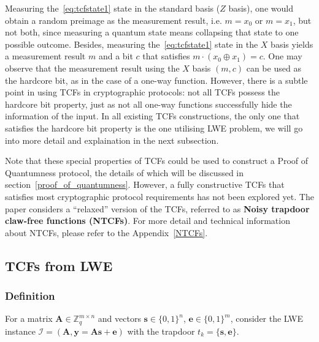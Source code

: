 \documentclass[cryptography,review,submit,pdftex,moreauthors,amsmath,amssymb,aps,strict]{Definitions/mdpi}
\begin{document}
Measuring the~\eqref{eq:tcfstate1} state in the standard basis ($Z$ basis), one would obtain a random preimage as the measurement result, i.e. $m=x_0$ or $m = x_1$, but not both, since measuring a quantum state means collapsing that state to one possible outcome. Besides, measuring the~\eqref{eq:tcfstate1} state in the $X$ basis yields a measurement result $m$ and a bit $c$ that satisfies $m \cdot (x_0\oplus x_1) = c$. One may observe that the measurement result using the $X$ basis $(m,c)$ can be used as the hardcore bit, as in the case of a one-way function. However, there is a subtle point in using TCFs in cryptographic protocols: not all TCFs possess the hardcore bit property, just as not all one-way functions successfully hide the information of the input. In all existing TCFs constructions, the only one that satisfies the hardcore bit property is the one utilising LWE problem, we will go into more detail and explaination in the next subsection.

Note that these special properties of TCFs could be used to construct a Proof of Quantumness protocol, the details of which will be discussed in section~\ref{proof_of_quantumness}. However, a fully constructive TCFs that satisfies most cryptographic protocol requirements has not been explored yet. The paper \cite{Brakerski18_Interactiveproofofquantumness} considers a ``relaxed'' version of the TCFs, referred to as \textbf{Noisy trapdoor claw-free functions (NTCFs)}. For more detail and technical information about NTCFs, please refer to the Appendix~\ref{NTCFs}.

\subsection{TCFs from LWE}
\subsubsection{Definition}
For a matrix $\mathbf{A}\in\mathbb{Z}^{m\times n}_q$ and vectors $\mathbf{s}\in\{0,1\}^n$, $\mathbf{e}\in\{0,1\}^{m}$, consider the LWE instance $\mathcal{I}=(\mathbf{A},\mathbf{y}=\mathbf{A}\mathbf{s}+\mathbf{e})$ with the trapdoor $t_k=\{\mathbf{s},\mathbf{e}\}$. 
\end{document}
